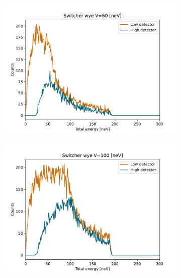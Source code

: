 \begin{figure}
\centering
\begin{subfigure}{.5\textwidth}
  \centering
  \includegraphics[width=\textwidth]{figures/fermi60_E_hist.pdf}
  \caption{}\label{subfig:V=60_simul}
\end{subfigure}%
\begin{subfigure}{.5\textwidth}
  \centering
  \includegraphics[width=\textwidth]{figures/fermi100_E_hist.pdf}
  \caption{}\label{subfig:V=100_simul}
\end{subfigure}
\begin{subfigure}{.5\textwidth}
  \centering

\end{subfigure}
\end{figure}
